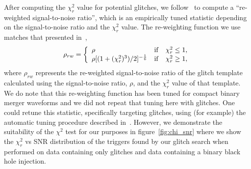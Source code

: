 After computing the $\chi_{r}^{2}$ value for potential \scl{} glitches, we follow~\cite{rw_snr_eq} to compute a ``re-weighted signal-to-noise ratio'', which is an empirically tuned statistic depending on the signal-to-noise ratio and the $\chi_{r}^{2}$ value.  The re-weighting function we use matches that presented in~\cite{rw_snr_eq},
%
\begin{equation}
\rho_{rw} =  \left\{  \begin{array}{l@{\quad}cr} 
\rho & \mathrm{if} & \chi_{r}^{2} \leq 1, \\  
\rho [(1 + (\chi_{r}^{2})^3)/2]^{-\frac{1}{6}} &  \mathrm{if} & \chi_{r}^{2} \ge 1,   
\end{array}\right.
\label{eqn:reweighting}
\end{equation}
%
where $\rho_{rw}$ represents the re-weighted signal-to-noise ratio of the \scl{} glitch template calculated using the signal-to-noise ratio, $\rho$, and the $\chi_{r}^{2}$ value of that template.
We do note that this re-weighting function has been tuned for compact binary merger waveforms and we did not repeat that tuning here with \scl{} glitches. One could retune this statistic, specifically targeting \scl{} glitches, using (for example) the automatic tuning procedure described in~\cite{McIsaac_2022}. However, we demonstrate the suitability of the $\chi^{2}$ test for our purposes in figure~\ref{fig:chi_snr} where we show the $\chi_{r}^{2}$ vs SNR distribution of the triggers found by our \scl{} glitch search when performed on data containing only \scl{} glitches and data containing a binary black hole \gw{} injection.


